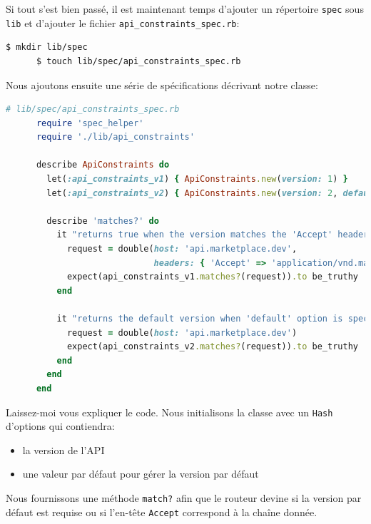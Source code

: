 \documentclass[]{report}
\begin{document}
    Si tout s'est bien passé, il est maintenant temps d'ajouter un répertoire \verb|spec| sous \verb|lib| et d'ajouter le fichier \verb|api_constraints_spec.rb|:

    \begin{scriptsize}
      \begin{lstlisting}[language=bash]
      $ mkdir lib/spec
      $ touch lib/spec/api_constraints_spec.rb
      \end{lstlisting}
    \end{scriptsize}

    Nous ajoutons ensuite une série de spécifications décrivant notre classe:

    \begin{scriptsize}
      \begin{lstlisting}[language=ruby, caption={Test de ApiConstraints}, label={lst:create_api_constraints_spec}]
      # lib/spec/api_constraints_spec.rb
      require 'spec_helper'
      require './lib/api_constraints'

      describe ApiConstraints do
        let(:api_constraints_v1) { ApiConstraints.new(version: 1) }
        let(:api_constraints_v2) { ApiConstraints.new(version: 2, default: true) }

        describe 'matches?' do
          it "returns true when the version matches the 'Accept' header" do
            request = double(host: 'api.marketplace.dev',
                             headers: { 'Accept' => 'application/vnd.marketplace.v1' })
            expect(api_constraints_v1.matches?(request)).to be_truthy
          end

          it "returns the default version when 'default' option is specified" do
            request = double(host: 'api.marketplace.dev')
            expect(api_constraints_v2.matches?(request)).to be_truthy
          end
        end
      end
      \end{lstlisting}
    \end{scriptsize}

    Laissez-moi vous expliquer le code. Nous initialisons la classe avec un \verb|Hash| d'options qui contiendra:

    \begin{itemize}
      \item la version de l'API
      \item une valeur par défaut pour gérer la version par défaut
    \end{itemize}

    Nous fournissons une méthode \verb|match?| afin que le routeur devine si la version par défaut est requise ou si l'en-tête \verb|Accept| correspond à la chaîne donnée.
\end{document}
